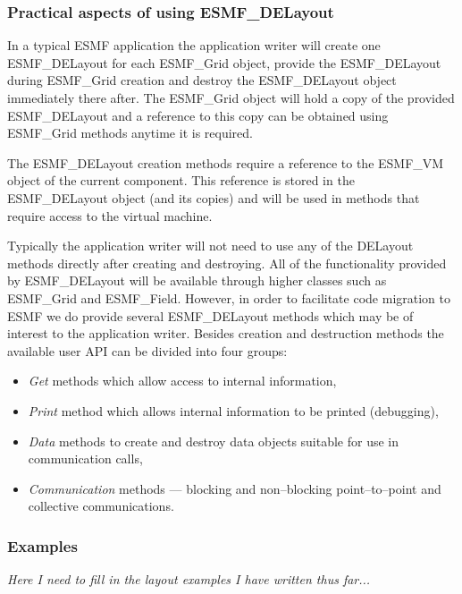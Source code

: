 
\subsubsection{Practical aspects of using ESMF\_DELayout}
In a typical ESMF application the application writer will create one ESMF\_DELayout for each ESMF\_Grid object, provide the ESMF\_DELayout during ESMF\_Grid creation and destroy the ESMF\_DELayout object immediately there after. The ESMF\_Grid object will hold a copy of the provided ESMF\_DELayout and a reference to this copy can be obtained using ESMF\_Grid methods anytime it is required.

The ESMF\_DELayout creation methods require a reference to the ESMF\_VM object of the current component. This reference is stored in the ESMF\_DELayout object (and its copies) and will be used in methods that require access to the virtual machine.

Typically the application writer will not need to use any of the DELayout methods directly after creating and destroying. All of the functionality provided by ESMF\_DELayout will be available through higher classes such as ESMF\_Grid and ESMF\_Field. However, in order to facilitate code migration to ESMF we do provide several ESMF\_DELayout methods which may be of interest to the application writer. Besides creation and destruction methods the available user API can be divided into four groups:
\begin{itemize}
\item {\em Get} methods which allow access to internal information,
\item {\em Print} method which allows internal information to be printed (debugging),
\item {\em Data} methods to create and destroy data objects suitable for use in communication calls,
\item {\em Communication} methods --- blocking and non--blocking point--to--point and collective communications.
\end{itemize}

\subsubsection{Examples}
{\em Here I need to fill in the layout examples I have written thus far...}
